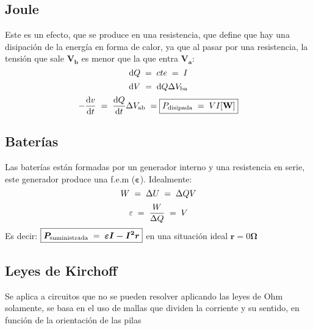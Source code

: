 \subsection{Joule}
\noindent Este es un efecto, que se produce en una resistencia, que define que hay una disipación de la energía en forma de calor, ya que al pasar por una resistencia, la tensión que sale \(\bm{V_b}\) es menor que la que entra \(\bm{V_a}\):
\[
        \mathrm{d}Q \hspace{1mm} = \hspace{1mm} cte \hspace{1mm} = \hspace{1mm} I
\]
\[
        \mathrm{d}V \hspace{1mm} = \hspace{1mm} \mathrm{d}Q \Delta V_{\textnormal{ba}}\]
\[
        -\frac{\mathrm{d} v}{\mathrm{d} t} \hspace{1mm} = \hspace{1mm} \frac{\mathrm{d} Q}{\mathrm{d} t}\Delta V_{\textnormal{ab}} \hspace{1mm} = \boxed{P_{\textnormal{disipada}} \hspace{1mm} = \hspace{1mm} V I \textnormal{[\textbf{W}]}}
\]
\subsection{Baterías}
\noindent Las baterías están formadas por un generador interno y una resistencia en serie, este generador produce una f.e.m (\(\bm{\varepsilon}\)). Idealmente:
\[
        W \hspace{1mm} = \hspace{1mm} \Delta U \hspace{1mm} = \hspace{1mm} \Delta QV
\]
\[
        \varepsilon \hspace{1mm} = \hspace{1mm} \frac{W}{\Delta Q} \hspace{1mm} = \hspace{1mm} V
\]
Es decir: \(\boxed{\bm{P_{\textnormal{suministrada}}} \hspace{1mm} = \hspace{1mm} \bm{\varepsilon I - I^2r}}\) en una situación ideal \(\bm{r}=\)0\(\bm{\Omega}\)
\subsection{Leyes de Kirchoff}
\noindent Se aplica a circuitos que no se pueden resolver aplicando las leyes de Ohm solamente, se basa en el uso de mallas que dividen la corriente y su sentido, en función de la orientación de las pilas
